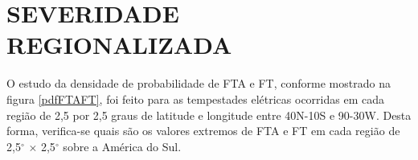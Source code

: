 
\section{SEVERIDADE REGIONALIZADA}


O estudo da densidade de probabilidade de FTA e FT, conforme mostrado na figura \ref{pdfFTAFT}, foi feito para as tempestades elétricas ocorridas em cada região de 2,5 por 2,5 graus de latitude e longitude entre 40N-10S e 90-30W. Desta forma, verifica-se quais são os valores extremos de FTA e FT em cada região de 2,5$^{\circ}$ $\times$ 2,5$^{\circ}$ sobre a América do Sul. 




